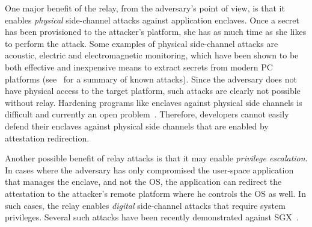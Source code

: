 \parasaver
{} One major benefit of the relay, from the adversary's point of view, is that it enables \emph{physical} side-channel attacks against application enclaves. Once a secret has been provisioned to the attacker's platform, she has as much time as she likes to perform the attack. Some examples of physical side-channel attacks are acoustic, electric and electromagnetic monitoring, which have been shown to be both effective and inexpensive means to extract secrets from modern PC platforms (see~\cite{genkin2016physical} for a summary of known attacks). Since the adversary does not have physical access to the target platform, such attacks are clearly not possible without relay. Hardening programs like enclaves against physical side channels is difficult and currently an open problem~\cite{genkin2016physical}. Therefore, developers cannot easily defend their enclaves against physical side channels that are enabled by attestation redirection.

\parasaver
{}
Another possible benefit of relay attacks is that it may enable \emph{privilege escalation}. In cases where the adversary has only compromised the user-space application that manages the enclave, and not the OS, the application can redirect the attestation to the attacker's remote platform where he controls the OS as well. In such cases, the relay enables \emph{digital} side-channel attacks that require system privileges. Several such attacks have been recently demonstrated against SGX~\cite{moghimi2017cachezoom, sgxcache, gotzfried2017cache}.


